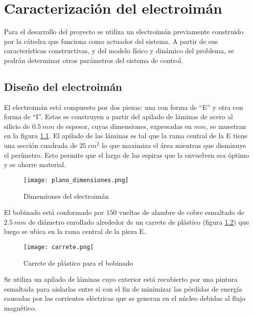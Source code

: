 \chapter{Caracterización del  electroimán}  \label{cap:CaracterizacionElectroiman}

\noindent Para el desarrollo del proyecto se utiliza un electroimán previamente construido por la cátedra que funciona como actuador del sistema. A partir de sus características constructivas, y del modelo físico y dinámico del problema, se podrán determinar otros parámetros del sistema de control.

\section{Diseño del electroimán} \label{section_disenio_electroimán}



\noindent El electroimán está compuesto por dos piezas: una con forma de “E” y otra con forma de “I”. Estas se construyen a partir del apilado de láminas de acero al silicio de $0.5\:mm$ de espesor, cuyas dimensiones, expresadas en $mm$, se muestran en la figura \ref{fig:img_plano_dimensiones}. El apilado de las láminas es tal que la rama central de la E tiene una sección cuadrada de $25\:cm^{2}$ lo que maximiza el área mientras que disminuye el perímetro. Esto permite que el largo de las espiras que la envuelven sea óptimo y se ahorre material.

\begin{figure}[H]
	\centering
	\texttt{[image: plano\_dimensiones.png]}
	\caption{Dimensiones del electroimán}
	\label{fig:img_plano_dimensiones}
\end{figure}

\noindent El bobinado está conformado por $150$ vueltas de alambre de cobre esmaltado de $2.5\:mm$ de diámetro enrollado alrededor de un carrete de plástico (figura \ref{fig:img_carrete}) que luego se ubica en la rama central de la pieza E.

\begin{figure}[H]
	\centering
	\texttt{[image: carrete.png]}
	\caption{Carrete de plástico para el bobinado}
	\label{fig:img_carrete}
\end{figure}


\noindent Se utiliza un apilado de láminas cuyo exterior está recubierto por una pintura esmaltada para aislarlas entre sí con el fin de minimizar las pérdidas de energía causadas por las corrientes eléctricas que se generan en el núcleo debidas al flujo magnético. 

